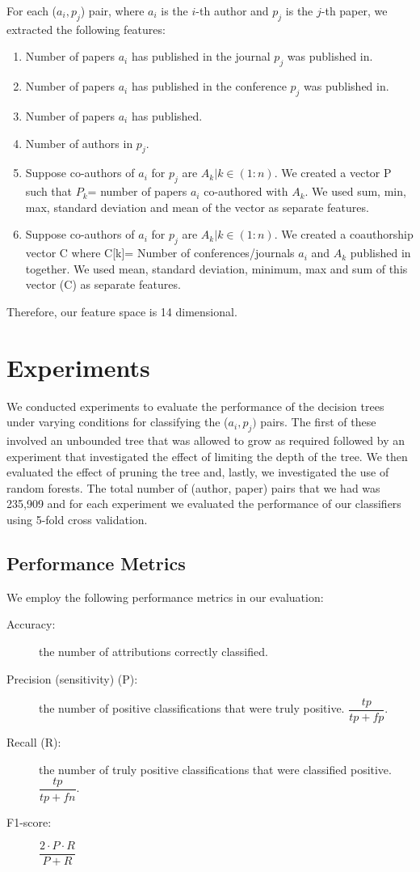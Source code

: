 \documentclass[letterpaper,12pt]{article}
\begin{document}
For each ($a_i,p_j$) pair, where $a_i$ is the $i$-th author and $p_j$ is the $j$-th paper, we extracted the following features:
\begin{enumerate}
\item Number of papers $a_i$ has published in the journal $p_j$ was published in.
\item Number of papers $a_i$ has published in the conference $p_j$ was published in.
\item Number of papers $a_i$ has published.
\item Number of authors in $p_j$.
\item Suppose co-authors of $a_i$ for $p_j$ are $A_k | k \in (1:n)$. We created a vector P such that $P_{k}$= number of papers $a_i$ co-authored with $A_k$. We used sum, min, max, standard deviation and mean of the vector as separate features.
\item Suppose co-authors of $a_i$ for $p_j$ are $A_k | k \in (1:n)$. We created a coauthorship vector C where C[k]= Number of conferences/journals $a_i$ and $A_k$ published in together. We used mean, standard deviation, minimum, max and sum of this vector (C) as separate features.  
\end{enumerate}

Therefore, our feature space is 14 dimensional. 

\section{Experiments}
We conducted experiments to evaluate the performance of the decision trees under varying conditions for classifying the ($a_i, p_j)$ pairs. The first of these involved an unbounded tree that was allowed to grow as required followed by an experiment that investigated the effect of limiting the depth of the tree. We then evaluated the effect of pruning the tree and, lastly, we investigated the use of random forests. The total number of (author, paper) pairs that we had was 235,909 and for each experiment we evaluated the performance of our classifiers using 5-fold cross validation.

\subsection{Performance Metrics}
We employ the following performance metrics in our evaluation:

\begin{description}
\item[Accuracy:] the number of attributions correctly classified.
\item[Precision (sensitivity) (P):] the number of positive classifications that were truly positive. $\dfrac{tp}{tp+fp}$.
\item[Recall (R):] the number of truly positive classifications that were classified positive. $\dfrac{tp}{tp+fn}$.
\item[F1-score:] $\dfrac{2\cdot P \cdot R}{P + R}$
\end{description}
\end{document}
